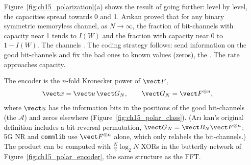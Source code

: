 Figure~\ref{fig:ch15_polarization}(a) shows the result of going further: level by level, the
capacities spread towards 0 and 1. Ar\i kan proved that for any binary symmetric memoryless channel,
as $N\to\infty$, the fraction of bit-channels with capacity near 1 tends to $I(W)$ and the fraction
with capacity near 0 to $1-I(W)$. The channels . The coding strategy follows: send
information on the good bit-channels and fix the bad ones to known values (zeros), the
. The rate approaches capacity.



The encoder is the $n$-fold Kronecker power of $\vect F$,
\begin{equation}
\vect x=\vect u\,\vect G_N,\qquad\vect G_N=\vect F^{\otimes n},
\label{eq:ch15:polarenc}
\end{equation}
where $\vect u$ has the information bits in the positions of the good bit-channels (the
 $\mathcal A$) and zeros elsewhere (Figure~\ref{fig:ch15_polar_class}). (Ar\i
kan's original definition includes a bit-reversal permutation, $\vect G_N=\vect B_N\vect F^{\otimes
n}$; 5G NR and \texttt{commlib} use $\vect F^{\otimes n}$ alone, which only relabels the
bit-channels.) The product can be computed with $\frac N2\log_2N$ XORs in the butterfly network of
Figure~\ref{fig:ch15_polar_encoder}, the same structure as the FFT.

